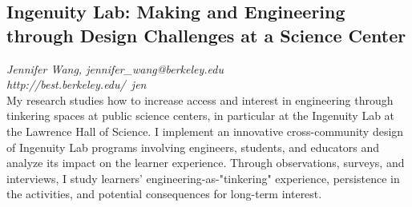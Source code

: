 \documentclass[foldmark,10pt,a4paper,notumble]{leaflet}
\begin{document}
\subsection{Ingenuity Lab: Making and Engineering through Design Challenges at a Science Center}
\emph{Jennifer Wang, jennifer\_wang@berkeley.edu}\\
\emph{http://best.berkeley.edu/~jen}\\
My research studies how to increase access and interest in engineering through tinkering spaces at public science centers, in particular at the Ingenuity Lab at the Lawrence Hall of Science. I implement an innovative cross-community design of Ingenuity Lab programs involving engineers, students, and educators and analyze its impact on the learner experience. Through observations, surveys, and interviews, I study learners' engineering-as-"tinkering" experience, persistence in the activities, and potential consequences for long-term interest.
\end{document}
